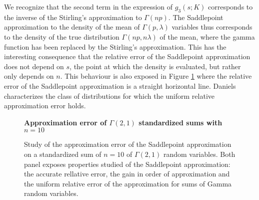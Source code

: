 \begin{example}
    We recognize that the second term in the expression of $g_3(s; K)$ corresponds to the inverse of the Stirling's approximation to $\Gamma(np)$. The Saddlepoint approximation to the density of the mean of $\Gamma(p, \lambda)$ variables thus corresponds to the density of the true distribution $\Gamma(np, n\lambda)$ of the mean, where the gamma function has been replaced by the Stirling's approximation. This has the interesting consequence that the relative error of the Saddlepoint approximation does not depend on $s$, the point at which the density is evaluated, but rather only depends on $n$. This behaviour is also exposed in Figure \ref{fig-saddlepoint-err} where the relative error of the Saddlepoint approximation is a straight horizontal line. Daniels \cite{daniels1954saddlepoint} characterizes the class of distributions for which the uniform relative approximation error holds.

    \begin{figure}
        \textbf{Approximation error of $\Gamma(2,1)$ standardized sums with $n=10$}
        \centering
        \caption{Study of the approximation error of the Saddlepoint approximation on a standardized sum of $n=10$ of $\Gamma(2, 1)$ random variables. Both panel exposes properties studied of the Saddlepoint approximation: the accurate rellative error, the gain in order of approximation and the uniform relative error of the approximation for sums of Gamma random variables.}
        \label{fig-saddlepoint-err}
    \end{figure}
    
\end{example}

